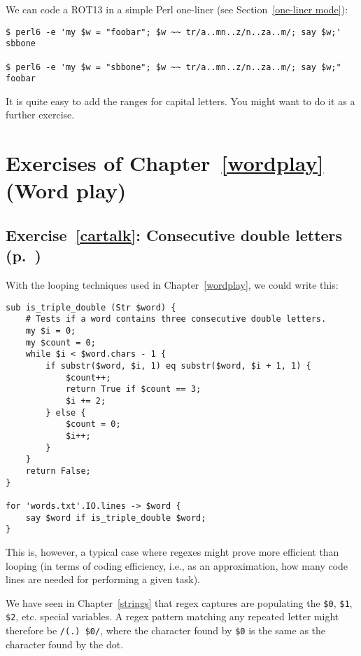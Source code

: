 We can code a ROT13 in a simple Perl one-liner (see Section~\ref{one-liner mode}):
\label{rot13_oneliner}

\begin{verbatim}
$ perl6 -e 'my $w = "foobar"; $w ~~ tr/a..mn..z/n..za..m/; say $w;'
sbbone

$ perl6 -e 'my $w = "sbbone"; $w ~~ tr/a..mn..z/n..za..m/; say $w;"
foobar
\end{verbatim}

It is quite easy to add the ranges for capital letters. You might want to do it as a further exercise.


\section{Exercises of Chapter~\ref{wordplay} (Word play)}

\subsection{Exercise~\ref{cartalk}: Consecutive double letters (p.~\pageref{cartalk})}
\label{sol_cartalk}

With the looping techniques used in Chapter~\ref{wordplay}, 
we could write this:

\begin{verbatim}
sub is_triple_double (Str $word) {
    # Tests if a word contains three consecutive double letters.
    my $i = 0;
    my $count = 0;
    while $i < $word.chars - 1 {
        if substr($word, $i, 1) eq substr($word, $i + 1, 1) {
            $count++;
            return True if $count == 3;
            $i += 2;
        } else {
            $count = 0;
            $i++;
        }
    }
    return False;
}

for 'words.txt'.IO.lines -> $word {
    say $word if is_triple_double $word;
}
\end{verbatim}
%

This is, however, a typical case where regexes might prove 
more efficient than looping  (in terms of coding efficiency, 
i.e., as an approximation, how many code lines are needed 
for performing a given task).

We have seen in Chapter~\ref{strings} that regex captures are 
populating the \verb'$0', \verb'$1', \verb'$2', etc. special 
variables. A regex pattern matching any repeated letter might 
therefore be \verb'/(.) $0/', where the character found 
by \verb'$0' is the same as the character found by the dot.

